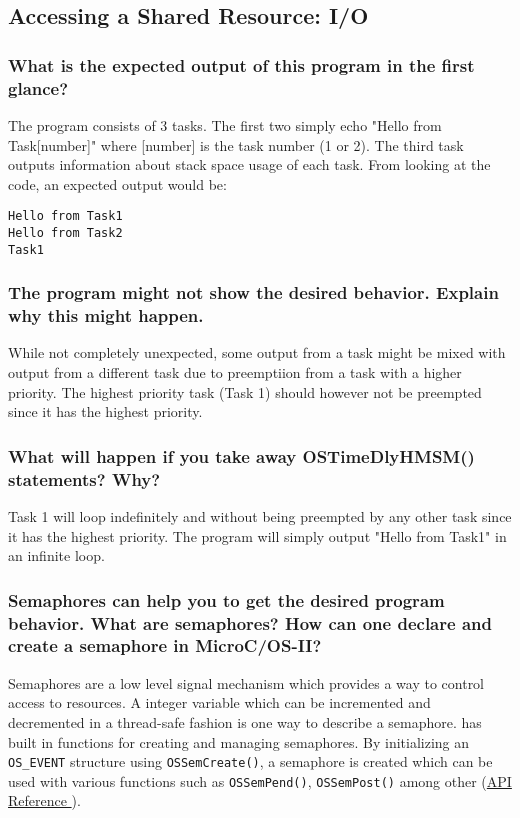 \setcounter{section}{3}
\setcounter{subsection}{0}

\subsection{Accessing a Shared Resource: I/O}

\subsubsection*{What is the expected output of this program in the first glance?}
The program consists of 3 tasks. The first two simply echo "Hello from Task[number]" where [number] is the task number (1 or 2). The third task outputs information about stack space usage of each task. From looking at the code, an expected output would be:
\begin{verbatim}
Hello from Task1 
Hello from Task2
Task1 
\end{verbatim}

\subsubsection*{The program might not show the desired behavior. Explain why this might happen.}
While not completely unexpected, some output from a task might be mixed with output from a different task due to preemptiion from a task with a higher priority. The highest priority task (Task 1) should however not be preempted since it has the highest priority.

\subsubsection*{What will happen if you take away OSTimeDlyHMSM() statements? Why?}
Task 1 will loop indefinitely and without being preempted by any other task since it has the highest priority. The program will simply output "Hello from Task1" in an infinite loop.

\subsubsection*{Semaphores can help you to get the desired program behavior. What are semaphores? How can one declare and create a semaphore in MicroC/OS-II?}
Semaphores are a low level signal mechanism which provides a way to control access to resources. A integer variable which can be incremented and decremented in a thread-safe fashion is one way to describe a semaphore.
\ucosii has built in functions for creating and managing semaphores. By initializing an \texttt{OS\_EVENT} structure using \texttt{OSSemCreate()}, a semaphore is created which can be used with various functions such as \texttt{OSSemPend()}, \texttt{OSSemPost()} among other (\href{https://doc.micrium.com/pages/viewpage.action?pageId=16879606}{\ucosii API Reference \ExternalLink}).

